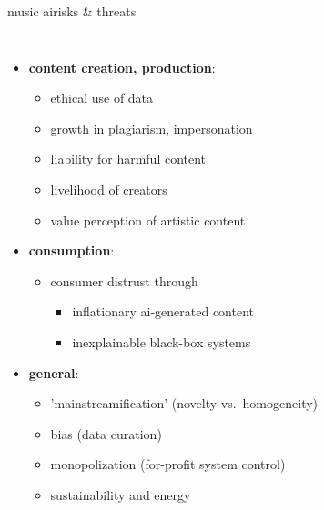 \begin{frame}{music ai}{risks \& threats}
    \vspace{-7mm}
    \begin{columns}
        \begin{itemize}
            \item \textbf{content creation, production}:
                \begin{itemize}
                    \item ethical use of data
                    \item growth in plagiarism, impersonation
                    \item liability for harmful content
                    \item livelihood of  creators
                    \item value perception of artistic content
                \end{itemize}
            \smallskip
            \item<2-> \textbf{consumption}:
                \begin{itemize}
                    \item consumer distrust through 
                        \begin{itemize}
                            \item inflationary ai-generated content
                            \item inexplainable black-box systems
                        \end{itemize}
                \end{itemize}
            \item<3-> \textbf{general}:
                \begin{itemize}
                    \item 'mainstreamification' (novelty vs.\ homogeneity)
                    \item bias (data curation)
                    \item monopolization (for-profit system control)
                    \item sustainability and energy 
                \end{itemize}
        \end{itemize}
        \begin{figure}
            \vspace{10mm}

\end{figure}
\end{columns}
\end{frame}
